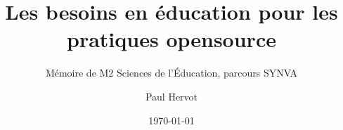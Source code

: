 \titlehead{}
\title{Les besoins en éducation pour les pratiques opensource}
\subtitle{Mémoire de M2 Sciences de l'Éducation, parcours SYNVA}
\author[PH]{Paul Hervot}
\date{\today}
\publishers{Université de Strasbourg} %

\frontmatter



\mainmatter
{}














\appendix




\backmatter



